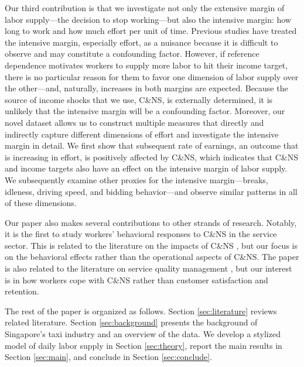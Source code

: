 \documentclass[reviewmode]{restat}
\begin{document}
Our third contribution is that we investigate not only the extensive margin of labor supply---the decision
to stop working---but also the intensive margin: how long to work and how much effort per unit of time. 
Previous studies have treated the intensive margin, especially effort, as a nuisance because it is 
difficult to observe and may constitute a confounding factor. However, if reference dependence motivates
workers to supply more labor to hit their income target, there is no particular reason for them to favor
one dimension of labor supply over the other---and, naturally, increases in both margins are expected.
Because the source of income shocks that we use, C\&NS, is externally determined, it is unlikely that the 
intensive margin will be a confounding factor. Moreover, our novel dataset allows us to construct multiple
measures that directly and indirectly capture different dimensions of effort and investigate the intensive
margin in detail. We first show that subsequent rate of earnings, an outcome that is increasing in effort,
is positively affected by C\&NS, which indicates that C\&NS and income targets also have an effect on the
intensive margin of labor supply. We subsequently examine other proxies for the intensive margin---breaks,
idleness, driving speed, and bidding behavior---and observe similar patterns in all of these dimensions.

Our paper also makes several contributions to other strands of research. Notably, it is the first to study
workers' behavioral responses to C\&NS in the service sector. This is related to the literature on the
impacts of C\&NS \citep{moore2001time,patrick2008reducing,norris2014empirical,feldman2014appointment}, 
but our focus is on the behavioral effects rather than the operational aspects of C\&NS. 
The paper is also related to the literature on service quality management \citep{cohen2018frustration},
but our interest is in how workers cope with C\&NS rather than customer satisfaction and retention. 

The rest of the paper is organized as follows. Section \ref{sec:literature} reviews related literature. 
Section \ref{sec:background} presents the background of Singapore's taxi industry and an overview of the data. 
We develop a stylized model of daily labor supply in Section \ref{sec:theory}, 
report the main results in Section \ref{sec:main}, and conclude in Section \ref{sec:conclude}.

\end{document}
